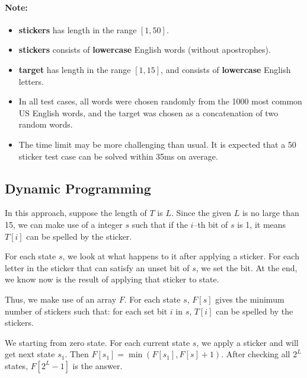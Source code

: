 \paragraph{Note:}
\begin{itemize}
\item \textbf{stickers} has length in the range $[1, 50]$.
\item \textbf{stickers} consists of \textbf{lowercase} English words (without apostrophes).
\item \textbf{target} has length in the range $[1, 15]$, and consists of \textbf{lowercase} English letters.
\item In all test cases, all words were chosen randomly from the 1000 most common US English words, and the target was chosen as a concatenation of two random words.
\item The time limit may be more challenging than usual. It is expected that a 50 sticker test case can be solved within 35ms on average.
\end{itemize}

\subsection{Dynamic Programming}
In this approach, suppose the length of $T$ is $L$. Since the given $L$ is no large than 15, we can make use of a integer $s$  such that if the $i$--th bit of $s$ is 1, it means $T[i]$ can be spelled by the sticker. 


For each state $s$, we look at what happens to it after applying a sticker. For each letter in the sticker that can satisfy an unset bit of $s$, we set the bit. At the end, we know now is the result of applying that sticker to state. 

Thus, we make use of an array $F$. For each state $s$, $F[s]$ gives the minimum number of stickers such that: for each set bit $i$ in $s$, $T[i]$ can be spelled by the stickers. 

We starting from zero state. For each current state $s$, we apply a sticker and will get next state $s_1$. Then $F[s_1]=\min(F[s_1], F[s]+1)$. After checking all $2^L$ states, $F[2^L-1]$ is the answer.

